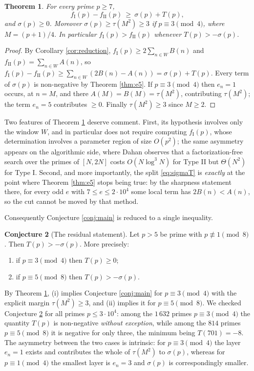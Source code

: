 \documentclass[11pt,reqno]{amsart}
\theoremstyle{plain}
\newtheorem{theorem}{Theorem}[section]
\theoremstyle{definition}
\newtheorem{conjecture}[theorem]{Conjecture}
\numberwithin{equation}{section}
\newcommand{\fI}{f_{\mathrm{I}}}
\newcommand{\fII}{f_{\mathrm{II}}}
\begin{document}
\begin{theorem}\label{thm:criterion}
For every prime $p\ge7$,
\[
  \fI(p)-\fII(p)\ \ge\ \sigma(p)+T(p),
\]
and $\sigma(p)\ge0$. Moreover $\sigma(p)\ge\tau(M^{2})\ge3$ if $p\equiv3\pmod4$, where
$M=(p+1)/4$. In particular $\fI(p)>\fII(p)$ whenever $T(p)>-\sigma(p)$.
\end{theorem}

\begin{proof}
By Corollary \ref{cor:reduction}, $\fI(p)\ge2\sum_{n\in W}B(n)$ and
$\fII(p)=\sum_{n\in W}A(n)$, so $\fI(p)-\fII(p)\ge\sum_{n\in W}(2B(n)-A(n))
=\sigma(p)+T(p)$. Every term of $\sigma(p)$ is non-negative by Theorem \ref{thm:e5}.
If $p\equiv3\pmod4$ then $e_{n}=1$ occurs, at $n=M$, and there
$A(M)=B(M)=\tau(M^{2})$, contributing $\tau(M^{2})$; the term $e_{n}=5$ contributes
$\ge0$. Finally $\tau(M^{2})\ge3$ since $M\ge2$.
\end{proof}

Two features of Theorem \ref{thm:criterion} deserve comment. First, its hypothesis
involves only the window $W$, and in particular does not require computing $\fI(p)$,
whose determination involves a parameter region of size $O(p^{2})$; the same asymmetry
appears on the algorithmic side, where Dahan \cite{Dahan} observes that a
factorization-free search over the primes of $[N,2N]$ costs $O(N\log^{3}N)$ for
Type II but $\Theta(N^{2})$ for Type I. Second, and more importantly, the split
\eqref{eq:sigmaT} is \emph{exactly} at the point where Theorem \ref{thm:e5} stops
being true: by the sharpness statement there, for every odd $e$ with
$7\le e\le2\cdot10^{4}$ some local term has
$2B(n)<A(n)$, so the cut cannot be moved by that method.

Consequently Conjecture \ref{conj:main} is reduced to a single inequality.

\begin{conjecture}[The residual statement]\label{conj:residual}
Let $p>5$ be prime with $p\not\equiv1\pmod8$. Then $T(p)>-\sigma(p)$. More precisely:
\begin{enumerate}
\item[(i)] if $p\equiv3\pmod4$ then $T(p)\ge0$;
\item[(ii)] if $p\equiv5\pmod8$ then $T(p)>-\sigma(p)$.
\end{enumerate}
\end{conjecture}

By Theorem \ref{thm:criterion}, (i) implies Conjecture \ref{conj:main} for
$p\equiv3\pmod4$ with the explicit margin $\tau(M^{2})\ge3$, and (ii) implies it for
$p\equiv5\pmod8$. We checked Conjecture \ref{conj:residual} for all primes
$p\le3\cdot10^{4}$: among the $1\,632$ primes $p\equiv3\pmod4$ the quantity $T(p)$ is
non-negative \emph{without exception}, while among the $814$ primes $p\equiv5\pmod8$ it
is negative for only three, the minimum being $T(701)=-8$. The asymmetry between the
two cases is intrinsic: for $p\equiv3\pmod4$ the layer $e_{n}=1$ exists and contributes
the whole of $\tau(M^{2})$ to $\sigma(p)$, whereas for $p\equiv1\pmod4$ the smallest
layer is $e_{n}=3$ and $\sigma(p)$ is correspondingly smaller.
\end{document}
